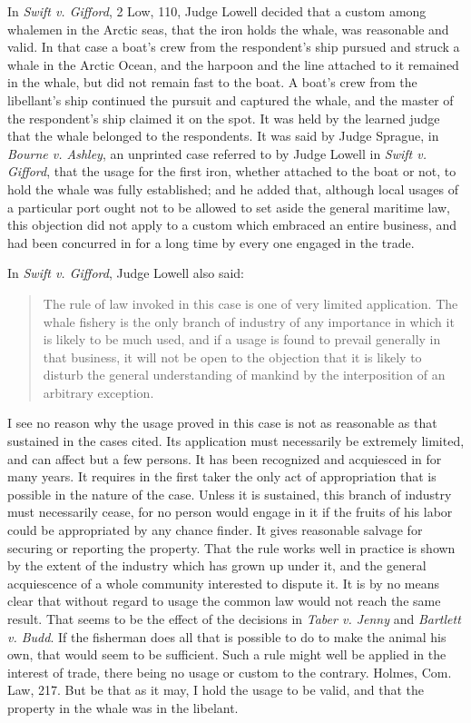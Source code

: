 In \emph{Swift v. Gifford}, 2 Low, 110, Judge Lowell decided that a custom among
whalemen in the Arctic seas, that the iron holds the whale, was reasonable and
valid. In that case a boat's crew from the respondent's ship pursued and struck
a whale in the Arctic Ocean, and the harpoon and the line attached to it
remained in the whale, but did not remain fast to the boat. A boat's crew from
the libellant's ship continued the pursuit and captured the whale, and the
master of the respondent's ship claimed it on the spot. It was held by the
learned judge that the whale belonged to the respondents. It was said by Judge
Sprague, in \emph{Bourne v. Ashley}, an unprinted case referred to by Judge
Lowell in
\emph{Swift v. Gifford}, that the usage for the first iron, whether attached to
the
boat or not, to hold the whale was fully established; and he added that,
although local usages of a particular port ought not to be allowed to set aside
the general maritime law, this objection did not apply to a custom which
embraced an entire business, and had been concurred in for a long time by every
one engaged in the trade.

In \emph{Swift v. Gifford}, Judge Lowell also said:
\begin{quote}
The rule of law invoked in this case is one of very limited application. The
whale fishery is the only branch of industry of any importance in which it is
likely to be much used, and if a usage is found to prevail generally in that
business, it will not be open to the objection that it is likely to disturb the
general understanding of mankind by the interposition of an arbitrary
exception.
\end{quote}

I see no reason why the usage proved in this case is not as reasonable as that
sustained in the cases cited. Its application must necessarily be extremely
limited, and can affect but a few persons. It has been recognized and acquiesced
in for many years. It requires in the first taker the only act of appropriation
that is possible in the nature of the case. Unless it is sustained, this branch
of industry must necessarily cease, for no person would engage in it if the
fruits of his labor could be appropriated by any chance finder. It gives
reasonable salvage for securing or reporting the property. That the rule works
well in practice is shown by the extent of the industry which has grown up under
it, and the general acquiescence of a whole community interested to dispute it.
It is by no means clear that without regard to usage the common law would not
reach the same result. That seems to be the effect of the decisions in
\emph{Taber v. Jenny} and \emph{Bartlett v. Budd}. If the fisherman does all
that is possible to do to
make the animal his own, that would seem to be sufficient. Such a rule might
well be applied in the interest of trade, there being no usage or custom to the
contrary. Holmes, Com. Law, 217. But be that as it may, I hold the usage to be
valid, and that the property in the whale was in the libelant.


